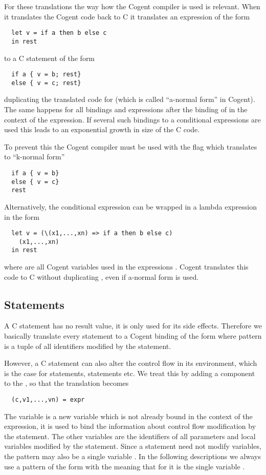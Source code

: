 For these translations the way how the Cogent compiler is used is relevant. When it translates the Cogent code back to 
C it translates an expression of the form
\begin{verbatim}
  let v = if a then b else c
  in rest
\end{verbatim}
to a C statement of the form
\begin{verbatim}
  if a { v = b; rest}
  else { v = c; rest}
\end{verbatim}
duplicating the translated code for  (which is called ``a-normal form'' in Cogent). 
The same happens for all bindings and expressions after
the binding of  in the context of the  expression. If several such bindings to a 
conditional expressions are used this leads to an exponential growth in size of the C code.

To prevent this the Cogent compiler must be used with the flag 
which translates to ``k-normal form''
\begin{verbatim}
  if a { v = b}
  else { v = c}
  rest
\end{verbatim}

Alternatively, the conditional expression can be wrapped in a lambda expression in the form
\begin{verbatim}
  let v = (\(x1,...,xn) => if a then b else c) 
    (x1,...,xn)
  in rest
\end{verbatim}
where  are all Cogent variables used in the expressions .
Cogent translates this code to C without duplicating , even if a-normal form is used.

\subsection{Statements}
\label{design-cstats-stat}

A C statement has no result value, it is only used for its side effects. Therefore we basically translate every
statement to a Cogent binding of the form  where pattern is a tuple of all identifiers
modified by the statement.

However, a C statement can also alter the control flow in its environment, which is the case for 
 statements,  statements etc. We treat this by adding a 
component to the , so that the translation becomes
\begin{verbatim}
  (c,v1,...,vn) = expr
\end{verbatim}
The variable  is a
new variable which is not already bound in the context of the expression, it is used to bind the information about 
control flow modification by the statement. The other variables are the identifiers of all parameters and local 
variables modified by the statement. Since a statement need not modify variables, the pattern may also be
a single variable . In the following descriptions we always use a pattern of the form 
with the meaning that for  it is the single variable .

